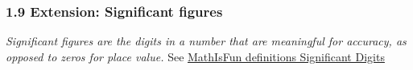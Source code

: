 

\fancyhead[LE]{\thepage}



\subsubsection*{1.9 Extension: Significant figures}
\emph{Significant figures are the digits in a number that are meaningful for accuracy, as opposed to zeros for place value.} See \href{https://www.mathsisfun.com/definitions/significant-digits.html}{MathIsFun definitions Significant Digits}
